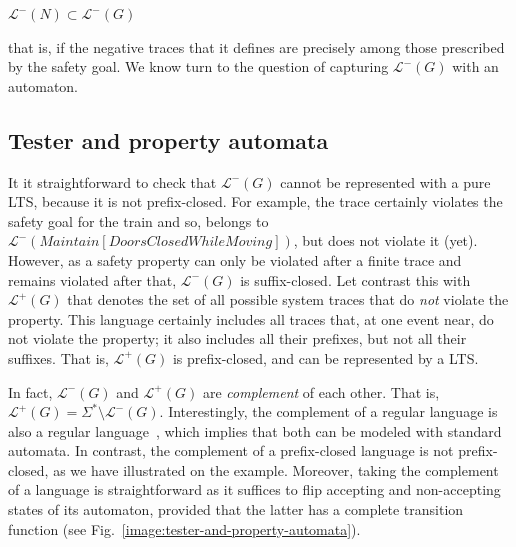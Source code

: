 \begin{center}
$\mathcal{L}^{-}(N) \subset \mathcal{L}^{-}(G)$
\end{center}

\noindent that is, if the negative traces that it defines are precisely among those prescribed by the safety goal. We know turn to the question of capturing $\mathcal{L}^{-}(G)$ with an automaton.

\subsection{Tester and property automata}

It it straightforward to check that $\mathcal{L}^{-}(G)$ cannot be represented with a pure LTS, because it is not prefix-closed. For example, the trace  certainly violates the safety goal for the train and so, belongs to $\mathcal{L}^{-}(Maintain[DoorsClosed While Moving])$, but  does not violate it (yet). However, as a safety property can only be violated after a finite trace and remains violated after that, $\mathcal{L}^{-}(G)$ is suffix-closed. Let contrast this with $\mathcal{L}^{+}(G)$ that denotes the set of all possible system traces that do \emph{not} violate the property. This language certainly includes all traces that, at one event near, do not violate the property; it also includes all their prefixes, but not all their suffixes. That is, $\mathcal{L}^{+}(G)$ is prefix-closed, and can be represented by a LTS. 

In fact, $\mathcal{L}^{-}(G)$ and $\mathcal{L}^{+}(G)$ are \emph{complement} of each other. That is, $\mathcal{L}^{+}(G) = \Sigma^{*} \setminus \mathcal{L}^{-}(G)$. Interestingly, the complement of a regular language is also a regular language~\cite{Hopcroft:1979}, which implies that both can be modeled with standard automata. In contrast, the complement of a prefix-closed language is not prefix-closed, as we have illustrated on the example. Moreover, taking the complement of a language is straightforward as it suffices to flip accepting and non-accepting states of its automaton, provided that the latter has a complete transition function (see Fig.~\ref{image:tester-and-property-automata}). 

